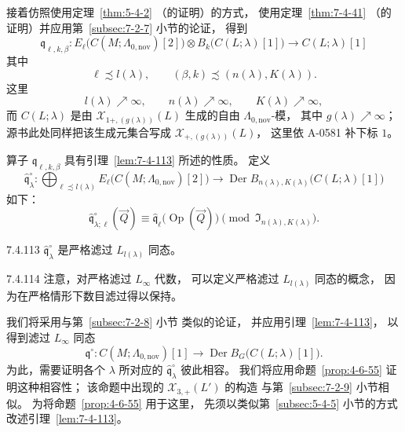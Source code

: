 接着仿照使用定理~\ref{thm:5-4-2}
（的证明）的方式，
使用定理~\ref{thm:7-4-41}
（的证明）并应用第~\ref{subsec:7-2-7} 小节的论证，
得到
\begin{equation}
\mathfrak q_{\ell,k,\beta}:
E_\ell\bigl(C(M;\Lambda_{0,\mathrm{nov}})[2]\bigr)
\otimes B_k\bigl(C(L;\lambda)[1]\bigr)
\longrightarrow C(L;\lambda)[1]
\tag{7.4.111}\label{eq:7-4-111}
\end{equation}
其中
\[
\ell\precsim l(\lambda),
\qquad
(\beta,k)\precsim(n(\lambda),K(\lambda)).
\]
这里
\[
l(\lambda)\nearrow\infty,
\qquad
n(\lambda)\nearrow\infty,
\qquad
K(\lambda)\nearrow\infty,
\]
而 $C(L;\lambda)$
是由
$\mathcal X_{1+,(g(\lambda))}(L)$
生成的自由 $\Lambda_{0,\mathrm{nov}}$-模，
其中 $g(\lambda)\nearrow\infty$；
源书此处同样把该生成元集合写成
$\mathcal X_{+,(g(\lambda))}(L)$，
这里依 A-0581 补下标 $1$。

算子 $\mathfrak q_{\ell,k,\beta}$
具有引理~\ref{lem:7-4-113} 所述的性质。
定义
\[
\widehat{\mathfrak q}^{\circ}_\lambda:
\bigoplus_{\ell\precsim l(\lambda)}
E_\ell\bigl(C(M;\Lambda_{0,\mathrm{nov}})[2]\bigr)
\longrightarrow
\operatorname{Der}B_{n(\lambda),K(\lambda)}
\bigl(C(L;\lambda)[1]\bigr)
\]
如下：
\begin{equation}
\widehat{\mathfrak q}^{\circ}_{\lambda;\ell}(\vec Q)
\equiv
\widehat{\mathfrak q}_\ell
\bigl(\operatorname{Op}(\vec Q)\bigr)
\pmod{\mathfrak I_{n(\lambda),K(\lambda)}}.
\tag{7.4.112}\label{eq:7-4-112}
\end{equation}

\begin{lemma}{7.4.113}\label{lem:7-4-113}
$\widehat{\mathfrak q}^{\circ}_\lambda$
是严格滤过 $L_{l(\lambda)}$ 同态。
\end{lemma}

\begin{remark}{7.4.114}\label{rem:7-4-114}
注意，对严格滤过 $L_\infty$ 代数，
可以定义严格滤过 $L_{l(\lambda)}$ 同态的概念，
因为在严格情形下数目滤过得以保持。
\end{remark}

我们将采用与第~\ref{subsec:7-2-8} 小节
类似的论证，
并应用引理~\ref{lem:7-4-113}，
以得到滤过 $L_\infty$ 同态
\[
\mathfrak q^{\circ}:
C(M;\Lambda_{0,\mathrm{nov}})[1]
\longrightarrow
\operatorname{Der}B_G\bigl(C(L;\lambda)[1]\bigr).
\]
为此，需要证明各个 $\lambda$ 所对应的
$\widehat{\mathfrak q}^{\circ}_\lambda$
彼此相容。
我们将应用命题~\ref{prop:4-6-55}
证明这种相容性；
该命题中出现的
$\mathcal X_{3,+}(L')$ 的构造
与第~\ref{subsec:7-2-9} 小节相似。
为将命题~\ref{prop:4-6-55}
用于这里，
先须以类似第~\ref{subsec:5-4-5} 小节的方式
改述引理~\ref{lem:7-4-113}。

